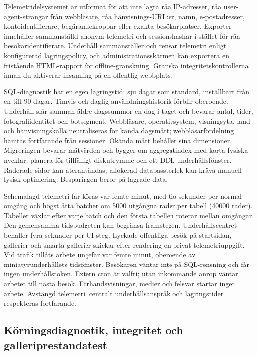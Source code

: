 \documentclass[11pt,a4paper]{article}
\begin{document}
Telemetridelsystemet är utformat för att inte lagra råa IP-adresser, råa
user-agent-strängar från webbläsare, råa hänvisnings-URL:er, namn,
e-postadresser, kontoidentifierare, begärandekroppar eller exakta
besökarplatser. Exporter innehåller sammanställd anonym telemetri och
sessionshashar i stället för råa besökaridentifierare. Underhåll sammanställer
och rensar telemetri enligt konfigurerad lagringspolicy, och
administrationsskärmen kan exportera en fristående HTML-rapport för
offline-granskning. Granska integritetskontrollerna innan du aktiverar insamling
på en offentlig webbplats.

SQL-diagnostik har en egen lagringstid: sju dagar som standard, inställbart
från en till 90 dagar. Timvis och daglig användningshistorik förblir oberoende.
Underhåll slår samman äldre dagssummor en dag i taget och bevarar antal, tider,
fotografiidentitet och botsegment. Webbläsare, operativsystem, visningsyta, land
och hänvisningskälla neutraliseras för kända dagsmått; webbläsarfördelning
hämtas
fortfarande från sessioner. Okända mått behåller sina dimensioner. Migreringen
bevarar mätvärden och bygger om aggregatindex med korta fysiska nycklar; planera
för tillfälligt diskutrymme och ett DDL-underhållsfönster. Raderade sidor kan
återanvändas; allokerad databasstorlek kan kräva manuell fysisk optimering.
Besparingen beror på lagrade data.

Schemalagd telemetri får köras var femte minut, med tio sekunder per normal
omgång och högst åtta batcher om 5000 utgångna rader per tabell (40000 rader).
Tabeller växlar efter varje batch och den första tabellen roterar mellan
omgångar.
Den gemensamma tidsbudgeten kan begränsa framstegen. Underhållscentret behåller
fyra sekunder per UI-steg. Lyckade offentliga besök på startsidan, gallerier och
smarta gallerier skickar
efter rendering en privat telemetriuppgift. Vid trafik tillåts arbete ungefär
var femte minut, oberoende av miniatyrunderhållets tidsfönster. Besökaren väntar
inte på SQL-rensning och får ingen underhållstoken. Extern cron är valfri;
utan inkommande anrop väntar arbetet till nästa besök. Förhandsvisningar, medier
och felsvar startar inget arbete. Avstängd telemetri, centralt underhållsanspråk
och lagringstider respekteras fortfarande.

\subsection{Körningsdiagnostik, integritet och galleriprestandatest}
\end{document}
